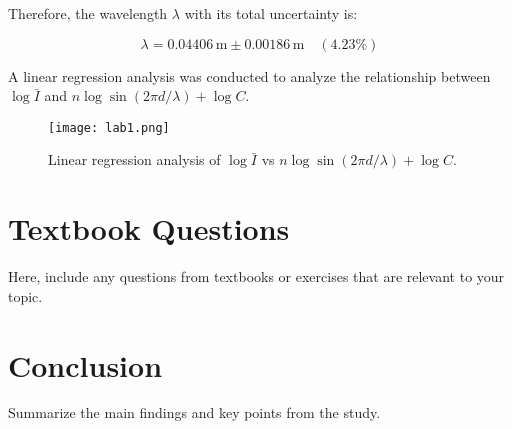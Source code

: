 \documentclass{article}
\begin{document}
Therefore, the wavelength \( \lambda \) with its total uncertainty is:

\[
\lambda = 0.04406 \, \text{m} \pm 0.00186 \, \text{m} \quad (4.23\%)
\]

A linear regression analysis was conducted to analyze the relationship between $\log \bar{I}$ and $n \log \sin\left(2 \pi d / \lambda \right) + \log C$. 

\begin{figure}[H]
    \centering
    \texttt{[image: lab1.png]}
    \caption{Linear regression analysis of $\log \bar{I}$ vs $n \log \sin\left(2 \pi d / \lambda \right) + \log C$.}
    \label{fig:regression}
\end{figure}

\section{Textbook Questions}
Here, include any questions from textbooks or exercises that are relevant to your topic.

\section{Conclusion}
Summarize the main findings and key points from the study.

\printbibliography
\end{document}
